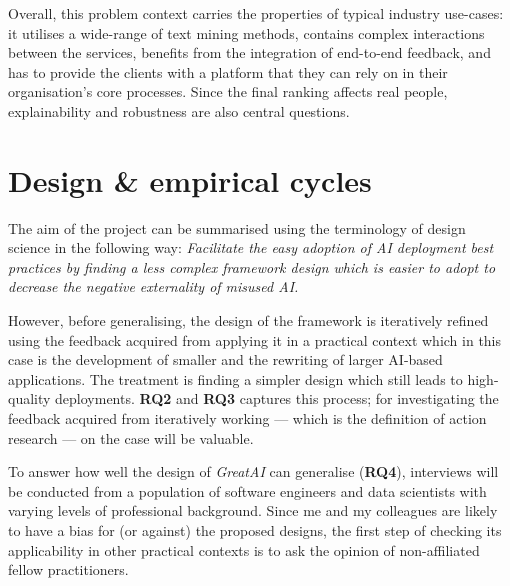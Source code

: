 Overall, this problem context carries the properties of typical industry use-cases: it utilises a wide-range of text mining methods, contains complex interactions between the services, benefits from the integration of end-to-end feedback, and has to provide the clients with a platform that they can rely on in their organisation's core processes. Since the final ranking affects real people, explainability and robustness are also central questions.

\section{Design \& empirical cycles}

The aim of the project can be summarised using the terminology of design science in the following way: 
\textit{Facilitate the easy adoption of AI deployment best practices
by finding a less complex framework design 
which is easier to adopt
to decrease the negative externality of misused AI.}

However, before generalising, the design of the framework is iteratively refined using the feedback acquired from applying it in a practical context which in this case is the development of smaller and the rewriting of larger AI-based applications. The treatment is finding a simpler design which still leads to high-quality deployments. \textbf{RQ2} and \textbf{RQ3} captures this process; for investigating the feedback acquired from iteratively working --- which is the definition of action research --- on the case will be valuable. 

To answer how well the design of \textit{GreatAI} can generalise (\textbf{RQ4}), interviews will be conducted from a population of software engineers and data scientists with varying levels of professional background. Since me and my colleagues are likely to have a bias for (or against) the proposed designs, the first step of checking its applicability in other practical contexts is to ask the opinion of non-affiliated fellow practitioners.
